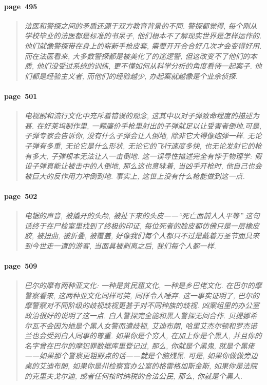 \paragraph*{page~495}
\begin{quotation}
    \itshape
    法医和警探之间的矛盾还源于双方教育背景的不同. 警探都觉得, 每个刚从学校毕业的法医都是标准的书呆子, 他们根本不了解现实世界是怎样运作的. 他们就像警探带在身上的崭新手枪皮套, 需要开开合合好几次才会变得好用. 而在法医看来, 大多数警探都是被美化了的巡逻警, 但这改变不了他们的本质, 他们没受过系统的训练, 更不懂如何从科学分析的角度看待一起案子. 他们都是经验主义者, 而他们的经验越少, 办起案就越像是个业余侦探. 
\end{quotation}

\paragraph*{page~501}
\begin{quotation}
    \itshape
    电视剧和流行文化中充斥着错误的观念, 这其中以对子弹致命程度的描述为甚. 在好莱坞制作里, 一颗廉价手枪里射出的子弹就足以让受害者倒地.可是, 子弹专家会告诉你, 没有什么子弹会让人倒地, 除非它大得像砲弹一样. 无论子弹有多重, 无论它是什么形状, 无论它的飞行速度多快, 也无论发射它的枪有多大, 子弹根本无法让人一击倒地. 这一误导性描述完全有悖于物理学: 假设子弹真能让被击中的人倒地, 那么这也意味着, 当凶手开枪时, 他自己也会被巨大的反作用力冲倒到地. 事实上, 这世上没有什么枪能做到这一点. 
\end{quotation}

\paragraph*{page~502}
\begin{quotation}
    \itshape
    电锯的声音, 被撬开的头颅, 被扯下来的头皮------``死亡面前人人平等'' 这句话终于在尸检室里找到了终极的印证, 每位死者的脸皮都仿佛只是一层橡皮胶, 被扭曲, 被折叠, 被覆盖, 好像我们每个人都只不过是戴着万圣节面具来到今世走一遭的游客, 当面具被剥离之后, 我们每个人都一样. 
\end{quotation}

\paragraph*{page~509}
\begin{quotation}
    \itshape
    巴尔的摩有两种亚文化: 一种是贫民窟文化, 一种是乡巴佬文化. 在巴尔的摩警察看来, 这两种亚文化同样可笑, 同样令人唾弃. 这一事实证明了, 巴尔的摩警察对不同阶级的歧视歧视更甚于对不同种族的歧视. 凶案组里的办公室政治很好的说明了这一点. 白人警探完全能和黑人警探无间合作. 贝提娜希尔瓦不会因为她是个黑人女警而遭歧视, 艾迪布朗, 哈里艾杰尔顿和罗杰诺兰也会受到白人同事的尊重. 如果你是个穷人, 在加上你是个黑人, 并且你的名字曾在巴尔的摩犯罪数据库里登记过, 那么, 你就是个黑鬼, 就是个黑佬------如果那个警察更粗野点的话------就是个脑残黑. 可是, 如果你做做旁边桌的艾迪布朗, 如果你是州检察官办公室的格雷格加斯金斯, 如果你是法院的克里夫戈尔迪, 或者任何按时纳税的合法公民, 那么, 你就是个黑人. 
\end{quotation}

